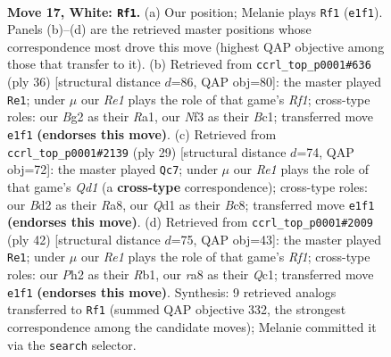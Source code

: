 \documentclass[11pt]{article}
\begin{document}
\clearpage

\begin{figure}[p]\centering
\begin{subfigure}{0.46\textwidth}\centering
\resizebox{\linewidth}{!}{%
\newchessgame
\chessboard[
  setfen={r1b1k1r1/2p1qp2/2n2np1/3p3p/p2P4/P4NP1/3BPPBP/R2QR1K1 w q - 2 17},
  showmover=false,
  pgfstyle=straightmove, color=movearrow, markmove={e1-f1}
]}
\caption{}
\end{subfigure}\hfill
\begin{subfigure}{0.46\textwidth}\centering
\resizebox{\linewidth}{!}{%
\newchessgame
\chessboard[
  setfen={1k1r1b1r/1pp1q1pb/p1n2p1p/P7/2BP4/2P1PN2/6PP/R1BQ1RK1 w - - 0 19},
  showmover=false,
  pgfstyle=straightmove, color=movearrow, markmove={f1-e1}
]}
\caption{}
\end{subfigure}
\\[4pt]
\begin{subfigure}{0.46\textwidth}\centering
\resizebox{\linewidth}{!}{%
\newchessgame
\chessboard[
  setfen={r1bq1rk1/1p3pp1/p4n1p/2bpNP2/8/2N2Q2/PPP3PP/1K1R1B1R b - - 2 15},
  showmover=false,
  pgfstyle=straightmove, color=movearrow, markmove={d8-c7}
]}
\caption{}
\end{subfigure}\hfill
\begin{subfigure}{0.46\textwidth}\centering
\resizebox{\linewidth}{!}{%
\newchessgame
\chessboard[
  setfen={r4rk1/p1q1npp1/b4n1p/2pp4/1P6/P1N2NP1/4PPBP/1RQ2RK1 w - - 1 22},
  showmover=false,
  pgfstyle=straightmove, color=movearrow, markmove={f1-e1}
]}
\caption{}
\end{subfigure}
\caption{\textbf{Move 17, White: \texttt{Rf1}.} (a) Our position; Melanie plays \texttt{Rf1} (\texttt{e1f1}). Panels (b)--(d) are the retrieved master positions whose correspondence most drove this move (highest QAP objective among those that transfer to it). (b) Retrieved from \texttt{ccrl\_top\_p0001\#636} (ply 36) [structural distance $d$=86, QAP obj=80]: the master played \texttt{Re1}; under $\mu$ our \emph{Re1} plays the role of that game's \emph{Rf1}; cross-type roles: our \emph{B}g2 as their \emph{R}a1, our \emph{N}f3 as their \emph{B}c1; transferred move \texttt{e1f1} \textbf{(endorses this move)}. (c) Retrieved from \texttt{ccrl\_top\_p0001\#2139} (ply 29) [structural distance $d$=74, QAP obj=72]: the master played \texttt{Qc7}; under $\mu$ our \emph{Re1} plays the role of that game's \emph{Qd1} (a \textbf{cross-type} correspondence); cross-type roles: our \emph{B}d2 as their \emph{R}a8, our \emph{Q}d1 as their \emph{B}c8; transferred move \texttt{e1f1} \textbf{(endorses this move)}. (d) Retrieved from \texttt{ccrl\_top\_p0001\#2009} (ply 42) [structural distance $d$=75, QAP obj=43]: the master played \texttt{Re1}; under $\mu$ our \emph{Re1} plays the role of that game's \emph{Rf1}; cross-type roles: our \emph{P}h2 as their \emph{R}b1, our \emph{r}a8 as their \emph{Q}c1; transferred move \texttt{e1f1} \textbf{(endorses this move)}. Synthesis: 9 retrieved analogs transferred to \texttt{Rf1} (summed QAP objective 332, the strongest correspondence among the candidate moves); Melanie committed it via the \texttt{search} selector.}
\label{fig:thought-m32}
\end{figure}
\end{document}
